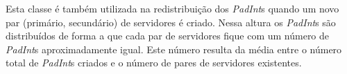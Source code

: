 Esta classe é também utilizada na redistribuição dos \textit{PadInt}s quando um novo par (primário, secundário) de servidores é criado. Nessa altura os \textit{PadInt}s são distribuídos de forma a que cada par de servidores fique com um número de \textit{PadInt}s aproximadamente igual. Este número resulta da média entre o número total de \textit{PadInt}s criados e o número de pares de servidores existentes.
